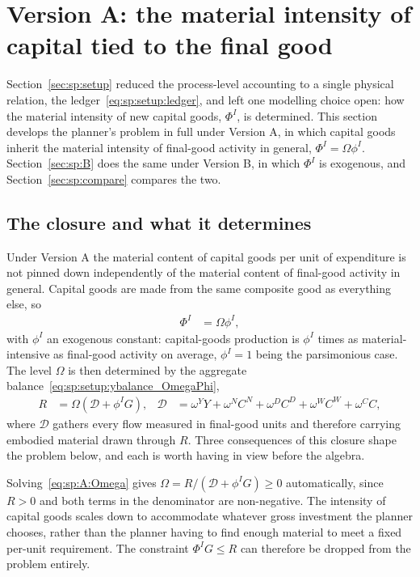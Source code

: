 \section{Version A: the material intensity of capital tied to the final good}\label{sec:sp:A}

Section~\ref{sec:sp:setup} reduced the process-level accounting to a single physical relation, the
ledger~\eqref{eq:sp:setup:ledger}, and left one modelling choice open: how the material intensity of
new capital goods, $\Phi^I$, is determined. This section develops the planner's problem in full under
Version A, in which capital goods inherit the material intensity of final-good activity in general,
$\Phi^I=\Omega\phi^I$. Section~\ref{sec:sp:B} does the same under Version B, in which $\Phi^I$ is
exogenous, and Section~\ref{sec:sp:compare} compares the two.


\subsection{The closure and what it determines}\label{sec:sp:A:closure}

Under Version A the material content of capital goods per unit of expenditure is not pinned down
independently of the material content of final-good activity in general. Capital goods are made from
the same composite good as everything else, so
\begin{align}
\Phi^I &= \Omega\phi^I,
\label{eq:sp:A:closure}
\end{align}
with $\phi^I$ an exogenous constant: capital-goods production is $\phi^I$ times as material-intensive
as final-good activity on average, $\phi^I=1$ being the parsimonious case. The level $\Omega$ is then
determined by the aggregate balance~\eqref{eq:sp:setup:ybalance_OmegaPhi},
\begin{align}
R &= \Omega\left(\mathcal D+\phi^IG\right),
&
\mathcal D &= \omega^YY+\omega^{N}C^N+\omega^{D}C^D+\omega^WC^W+\omega^CC,
\label{eq:sp:A:Omega}
\end{align}
where $\mathcal D$ gathers every flow measured in final-good units and therefore carrying embodied
material drawn through $R$. Three consequences of this closure shape the problem below, and each is
worth having in view before the algebra.

 Solving~\eqref{eq:sp:A:Omega} gives
$\Omega=R/\left(\mathcal D+\phi^IG\right)\ge0$ automatically, since $R>0$ and both terms in the
denominator are non-negative. The intensity of capital goods scales down to accommodate whatever
gross investment the planner chooses, rather than the planner having to find enough material to meet
a fixed per-unit requirement. The constraint $\Phi^IG\le R$ can therefore be dropped from the problem
entirely.

